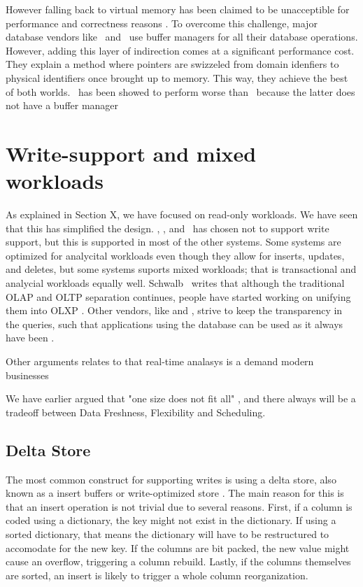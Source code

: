 However falling back to virtual memory has been claimed to be unacceptible for performance and correctness reasons \cite{Graefe2014-ds}. To overcome this challenge, major database vendors like \oracle~and \mssql~use buffer managers for all their database operations. However, adding this layer of indirection comes at a significant performance cost. They explain a method where pointers are swizzeled from domain idenfiers to physical identifiers once brought up to memory. This way, they achieve the best of both worlds.  \mssql~has been showed to perform worse than \vertipaq~because the latter does not have a buffer manager \cite{Ferrari2012-hm}


\section{Write-support and mixed workloads}
\label{sec:Write-support and mixed workloads}
As explained in Section X, we have focused on read-only workloads. We have seen that this has simplified the design. \tableau, \qlikview, and \vertipaq~has chosen not to support write support, but this is supported in most of the other systems. Some systems are optimized for analycital workloads even though they allow for inserts, updates, and deletes, but some systems suports mixed workloads; that is transactional and analycial workloads equally well. Schwalb \ea~writes that although the traditional OLAP and OLTP separation continues, people have started working on unifying them \cite{Schwalb2014-hn} into OLXP \cite{Plattner2014-fr}. Other vendors, like \oracle and \saph, strive to keep the transparency in the queries, such that applications using the database can be used as it always have been \cite{Lahiri2015-mz, Farber2012-vh}.

Other arguments relates to that real-time analasys is a demand modern businesses \cite{Primsch2011-ij}

We have earlier argued that "one size does not fit all" \cite{Psaroudakis2014-ma}, and there always will be a tradeoff between Data Freshness, Flexibility and Scheduling.

\subsection{Delta Store}
\label{sub:Delta Store}
The most common construct for supporting writes is using a delta store, also known as a insert buffers or write-optimized store \cite{Raman2013-em, Stonebraker2005-qz}. The main reason for this is that an insert operation is not trivial due to several reasons. First, if a column is coded using a dictionary, the key might not exist in the dictionary. If using a sorted dictionary, that means the dictionary will have to be restructured to accomodate for the new key. If the columns are bit packed, the new value might cause an overflow, triggering a column rebuild. Lastly, if the columns themselves are sorted, an insert is likely to trigger a whole column reorganization.

